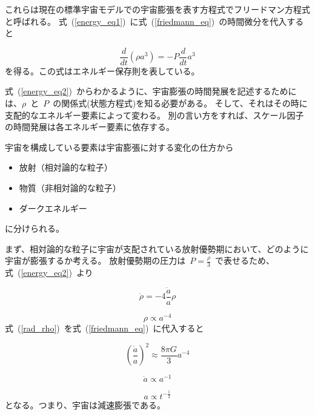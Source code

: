 これらは現在の標準宇宙モデルでの宇宙膨張を表す方程式でフリードマン方程式と呼ばれる。
式~(\ref{energy_eq1})~に式~(\ref{friedmann_eq})~の時間微分を代入すると

\begin{equation}
  \frac{d}{dt}(\rho a^3) = -P\frac{d}{dt}a^3
  \label{energy_eq2}
\end{equation}
を得る。この式はエネルギー保存則を表している。

式~(\ref{energy_eq2})~からわかるように、宇宙膨張の時間発展を記述するためには、$\rho$~と~$P$~の関係式(状態方程式)を知る必要がある。
そして、それはその時に支配的なエネルギー要素によって変わる。
別の言い方をすれば、スケール因子の時間発展は各エネルギー要素に依存する。

宇宙を構成している要素は宇宙膨張に対する変化の仕方から

\begin{itemize}
  \item 放射（相対論的な粒子） 
  \item 物質（非相対論的な粒子）
  \item ダークエネルギー
\end{itemize}
に分けられる。

まず、相対論的な粒子に宇宙が支配されている放射優勢期において、どのように宇宙が膨張するか考える。
放射優勢期の圧力は~$P = \frac{\rho}{3}$~で表せるため、式~(\ref{energy_eq2})~より

\begin{equation}
  \dot{\rho} = -4 \frac{\dot{a}}{a} \rho
  \label{rad_energy}
\end{equation}

\begin{equation}
  \rho \propto a^{-4}
  \label{rad_rho}
\end{equation}
式~(\ref{rad_rho})~を式~(\ref{friedmann_eq})~に代入すると

\begin{equation}
  (\frac{\dot{a}}{a})^2 \approx \frac{8 \pi G}{3} a^{-4}
  \label{rad_friedmann}
\end{equation}
\fi

\begin{equation}
  \dot{a} \propto a^{-1}
  \label{rad_friedmann}
\end{equation}

\begin{equation}
  a \propto t^{-\frac{1}{2}}
  \label{rad_t}
\end{equation}
となる。つまり、宇宙は減速膨張である。

